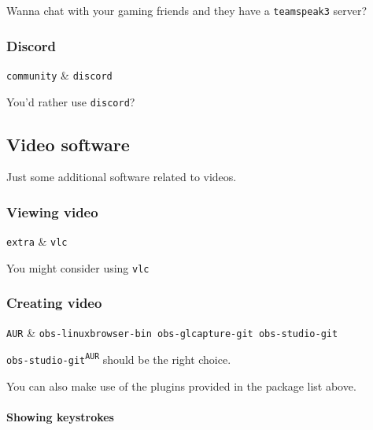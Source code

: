 \documentclass[10pt]{dustdoc}
\begin{document}
Wanna chat with your gaming friends and they have a \texttt{teamspeak3} server?

\subsubsection{Discord}
\label{sec:discord}

\begin{packagetable}
    \texttt{community} & \texttt{discord} \\
\end{packagetable}

You’d rather use \texttt{discord}?

\subsection{Video software}
\label{sec:gui-video-software}

Just some additional software related to videos.

\subsubsection{Viewing video}
\label{sec:viewing-video}

\begin{packagetable}
    \texttt{extra} & \texttt{vlc} \\
\end{packagetable}

You might consider using \texttt{vlc}

\subsubsection{Creating video}
\label{sec:creating-video}

\begin{packagetable}
    \texttt{AUR} & \texttt{obs-linuxbrowser-bin obs-glcapture-git obs-studio-git} \\
\end{packagetable}

\texttt{obs-studio-git\textsuperscript{\texttt{AUR}}} should be the right choice.

You can also make use of the plugins provided in the package list above.

\paragraph{Showing keystrokes}
\label{par:showing-keystrokes}
\end{document}
